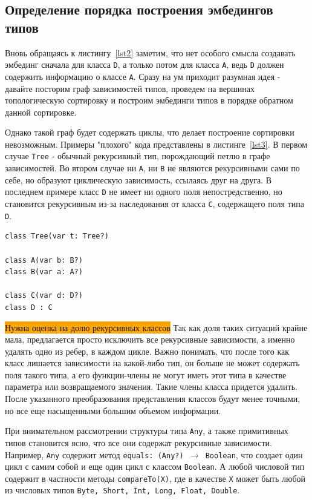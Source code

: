 \documentclass[times,specification,annotation]{itmo-student-thesis}
\begin{document}
\subsection{Определение порядка построения эмбедингов типов}\label{order}
Вновь обращаясь к листингу~\ref{lst2} заметим, что нет особого смысла создавать эмбединг сначала для класса \texttt{D}, а только потом для класса \texttt{A}, ведь \texttt{D} должен содержить информацию о классе \texttt{A}. Сразу на ум приходит разумная идея - давайте посторим граф зависимостей типов, проведем на вершинах топологическую сортировку и построим эмбединги типов в порядке обратном данной сортировке.

Однако такой граф будет содержать циклы, что делает построение сортировки невозможным. Примеры "плохого" кода представлены в листинге~\ref{lst3}. В первом случае \texttt{Tree} - обычный рекурсивный тип, порождающий петлю в графе зависимостей. Во втором случае ни \texttt{A}, ни \texttt{B} не являются рекурсивными сами по себе, но образуют циклическую зависимость, ссылаясь друг на друга. В последнем примере класс \texttt{D} не имеет ни одного поля непостредственно, но становится рекурсивным из-за наследования от класса \texttt{C}, содержащего поля типа \texttt{D}.

\begin{lstlisting}[float=!h,caption={Типы с циклическими зависимостями},label={lst3}]
class Tree(var t: Tree?)

class A(var b: B?)
class B(var a: A?)

class C(var d: D?)
class D : C
\end{lstlisting}

\colorbox{orange}{Нужна оценка на долю рекурсивных классов}
Так как доля таких ситуаций крайне мала, предлагается просто исключить все рекурсивные зависимости, а именно удалять одно из ребер, в каждом цикле. Важно понимать, что после того как класс лишается зависимости на какой-либо тип, он больше не может содержать поля такого типа, а его функции-члены не могут иметь этот типа в качестве параметра или возвращаемого значения. Такие члены класса придется удалить. После указанного преобразования представления классов будут менее точными, но все еще насыщенными большим объемом информации.

При внимательном рассмотрении структуры типа \texttt{Any}, а также примитивных типов становится ясно, что все они содержат рекурсивные зависимости. Например, \texttt{Any} содержит метод \texttt{equals: (Any?)  $\rightarrow$ Boolean}, что создает один цикл с самим собой и еще один цикл с классом \texttt{Boolean}. А любой числовой тип содержит в частности методы \texttt{compareTo(X)}, где в качестве \texttt{X} может быть любой из числовых типов \texttt{Byte, Short, Int, Long, Float, Double}. 
\end{document}

